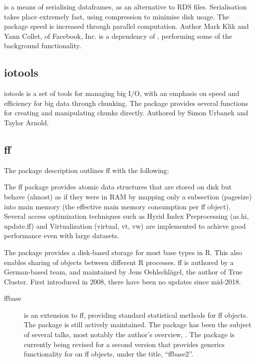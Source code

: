  is a means of serialising dataframes, as an alternative to RDS
files\cite{klik19}. Serialisation takes place extremely fast, using
compression to minimise disk usage. The package speed is increased
through parallel computation. Author Mark Klik and Yann Collet, of
Facebook, Inc.  is a dependency of , performing some of the
background functionality.

\hypertarget{sec:iotools}{%
    \subsection{iotools}\label{sec:iotools}}

iotools is a set of tools for managing big I/O, with an emphasis on
speed and efficiency for big data through chunking\cite{urbanek20b}. The
package provides several functions for creating and manipulating chunks
directly. Authored by Simon Urbanek and Taylor Arnold.

\hypertarget{sec:ff}{%
    \subsection{ff}\label{sec:ff}}

The package description outlines ff with the following:

\begin{displayquote}
    The ff package provides atomic data structures that are stored on disk
    but behave (almost) as if they were in RAM by mapping only a subsection
    (pagesize) into main memory (the effective main memory consumption per
    ff object). Several access optimization techniques such as Hyrid Index
    Preprocessing (as.hi, update.ff) and Virtualization (virtual, vt, vw)
    are implemented to achieve good performance even with large datasets.
\end{displayquote}

The package provides a disk-based storage for most base types in R. This
also enables sharing of objects between different R processes. ff is
authored by a German-based team, and maintained by Jens Oehlschlägel,
the author of True Cluster. First introduced in
2008\cite{adler08:_large_r}, there have been no updates since
mid-2018.

\begin{description}

    \item[ffbase\cite{jonge20}]
        is an extension to ff, providing standard statistical methods for ff
        objects. The package is still actively maintained. The package has been
        the subject of several talks, most notably the author's overview,
        \cite{wijffels13}. The package is currently being revised for a second
        version that provides generics functionality for  on ff objects,
        under the title, ``ffbase2''\cite{jonge15}.
\end{description}